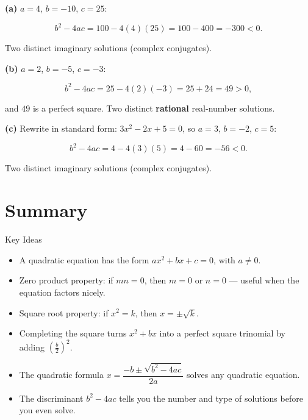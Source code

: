 \documentclass[12pt]{article}
\begin{document}
\begin{solutionbox}
\textbf{(a)} $a=4$, $b=-10$, $c=25$:

\[
b^2-4ac=100-4(4)(25)=100-400=-300<0.
\]

Two distinct imaginary solutions (complex conjugates).

\textbf{(b)} $a=2$, $b=-5$, $c=-3$:

\[
b^2-4ac=25-4(2)(-3)=25+24=49>0,
\]

and $49$ is a perfect square. Two distinct \textbf{rational} real-number solutions.

\textbf{(c)} Rewrite in standard form: $3x^2-2x+5=0$, so $a=3$, $b=-2$, $c=5$:

\[
b^2-4ac=4-4(3)(5)=4-60=-56<0.
\]

Two distinct imaginary solutions (complex conjugates).
\end{solutionbox}

  

\section*{Summary}

\begin{friendlyrule}{Key Ideas}
\begin{itemize}
    \item A quadratic equation has the form $ax^2+bx+c=0$, with $a\neq 0$.
    \item Zero product property: if $mn=0$, then $m=0$ or $n=0$ --- useful when the equation factors nicely.
    \item Square root property: if $x^2=k$, then $x=\pm\sqrt{k}$.
    \item Completing the square turns $x^2+bx$ into a perfect square trinomial by adding $\left(\frac{b}{2}\right)^2$.
    \item The quadratic formula $x=\dfrac{-b\pm\sqrt{b^2-4ac}}{2a}$ solves any quadratic equation.
    \item The discriminant $b^2-4ac$ tells you the number and type of solutions before you even solve.
\end{itemize}
\end{friendlyrule}
\end{document}
